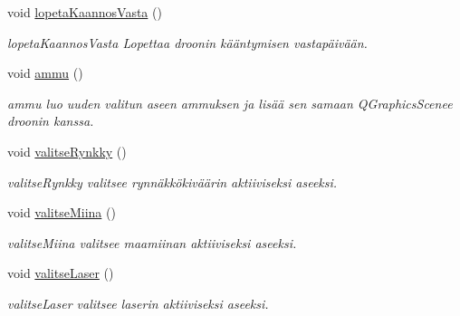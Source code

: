\begin{DoxyCompactItemize}
void \hyperlink{class_drooni_a269a91622768bd2c56ac1b2a94151420}{lopeta\-Kaannos\-Vasta} ()
\begin{DoxyCompactList}\small\item\em lopeta\-Kaannos\-Vasta Lopettaa droonin kääntymisen vastapäivään. \end{DoxyCompactList}\item 
void \hyperlink{class_drooni_ac4a9ca011049c1098aa462a7d773c03b}{ammu} ()
\begin{DoxyCompactList}\small\item\em ammu luo uuden valitun aseen ammuksen ja lisää sen samaan Q\-Graphics\-Scenee droonin kanssa. \end{DoxyCompactList}\item 
void \hyperlink{class_drooni_acc75f5e60f161b914dd6265e59783660}{valitse\-Rynkky} ()
\begin{DoxyCompactList}\small\item\em valitse\-Rynkky valitsee rynnäkkökiväärin aktiiviseksi aseeksi. \end{DoxyCompactList}\item 
void \hyperlink{class_drooni_a3d70e2dcad21eed191d622b573f76012}{valitse\-Miina} ()
\begin{DoxyCompactList}\small\item\em valitse\-Miina valitsee maamiinan aktiiviseksi aseeksi. \end{DoxyCompactList}\item 
void \hyperlink{class_drooni_aaf79cb0fc772cb706a190c7ce7e1c893}{valitse\-Laser} ()
\begin{DoxyCompactList}\small\item\em valitse\-Laser valitsee laserin aktiiviseksi aseeksi. \end{DoxyCompactList}\end{DoxyCompactItemize}
